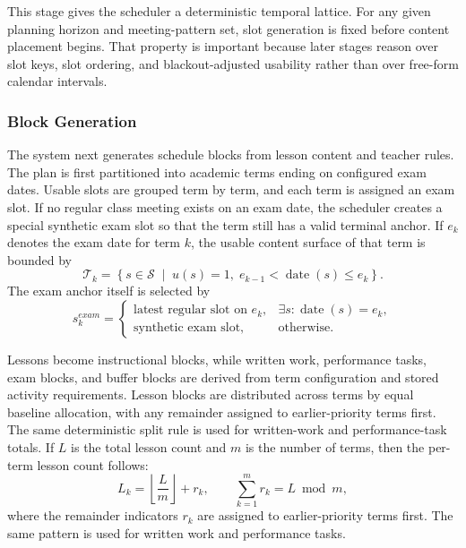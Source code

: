 \documentclass[conference]{IEEEtran}
\begin{document}
This stage gives the scheduler a deterministic temporal lattice. For any given
planning horizon and meeting-pattern set, slot generation is fixed before content
placement begins. That property is important because later stages reason over slot
keys, slot ordering, and blackout-adjusted usability rather than over free-form
calendar intervals.

\subsubsection{Block Generation}

The system next generates schedule blocks from lesson content and teacher rules.
The plan is first partitioned into academic terms ending on configured exam
dates. Usable slots are grouped term by term, and each term is assigned an exam
slot. If no regular class meeting exists on an exam date, the scheduler creates a
special synthetic exam slot so that the term still has a valid terminal anchor.
If \(e_k\) denotes the exam date for term \(k\), the usable content surface of
that term is bounded by
\begin{equation}
\mathcal{T}_k=
\left\{
s \in \mathcal{S}
\;\middle|\;
u(s)=1,\;
e_{k-1}<\operatorname{date}(s)\le e_k
\right\}.
\end{equation}
The exam anchor itself is selected by
\begin{equation}
s_k^{exam}=
\begin{cases}
\text{latest regular slot on } e_k, & \exists s:\operatorname{date}(s)=e_k,\\
\text{synthetic exam slot}, & \text{otherwise}.
\end{cases}
\end{equation}

Lessons become instructional blocks, while written work, performance tasks, exam
blocks, and buffer blocks are derived from term configuration and stored activity
requirements. Lesson blocks are distributed across terms by equal baseline
allocation, with any remainder assigned to earlier-priority terms first. The same
deterministic split rule is used for written-work and performance-task totals.
If \(L\) is the total lesson count and \(m\) is the number of terms, then the
per-term lesson count follows:
\begin{equation}
L_k=\left\lfloor \frac{L}{m} \right\rfloor + r_k,
\qquad
\sum_{k=1}^{m} r_k = L \bmod m,
\end{equation}
where the remainder indicators \(r_k\) are assigned to earlier-priority terms
first. The same pattern is used for written work and performance tasks.
\end{document}
